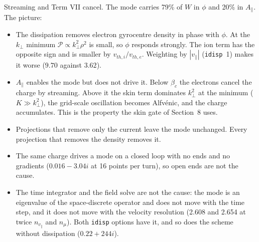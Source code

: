 \documentclass[10pt,a4paper]{article}
\makeatletter
\newcommand{\code}[1]{\texttt{#1}}
\renewcommand\section{\@startsection{section}{1}{\z@}{-1.6em plus -0.4em}{0.6em}{\sffamily\large\bfseries}}
\makeatother
\begin{document}
Streaming and Term VII cancel. The mode carries 79\% of $W$ in $\phi$ and 20\% in $A_\parallel$. The picture:
\begin{itemize}
\item The dissipation removes electron gyrocentre density in phase with $\phi$. At the $k_\perp$ minimum $\mathcal P\propto k_\perp^2\rho^2$ is small, so $\phi$ responds strongly. The ion term has the opposite sign and is smaller by $v_{th,i}/v_{th,e}$. Weighting by $|v_\parallel|$ (\code{idisp}~1) makes it worse ($9.70$ against $3.62$).
\item $A_\parallel$ enables the mode but does not drive it. Below $\beta_c$ the electrons cancel the charge by streaming. Above it the skin term dominates $k_\perp^2$ at the minimum ($K \gg k_\perp^2$), the grid-scale oscillation becomes Alfv\'enic, and the charge accumulates. This is the property the skin gate of Section~8 uses.
\item Projections that remove only the current leave the mode unchanged. Every projection that removes the density removes it.
\item The same charge drives a mode on a closed loop with no ends and no gradients ($0.016 - 3.04i$ at 16 points per turn), so open ends are not the cause.
\item The time integrator and the field solve are not the cause: the mode is an eigenvalue of the space-discrete operator and does not move with the time step, and it does not move with the velocity resolution (2.608 and 2.654 at twice $n_{v_\parallel}$ and $n_\mu$). Both \code{idisp} options have it, and so does the scheme without dissipation ($0.22+244i$).
\end{itemize}

\section{The June fix}
\end{document}
